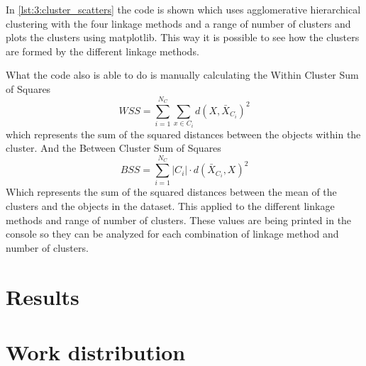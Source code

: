 \documentclass[twoside, a4paper, fleqn, reqno]{article}
\begin{document}
In \autoref{lst:3:cluster_scatters} the code is shown which uses agglomerative hierarchical clustering
with the four linkage methods and a range of number of clusters and plots the clusters using matplotlib.
This way it is possible to see how the clusters are formed by the different linkage methods.
\par
What the code also is able to do is manually calculating the Within Cluster Sum of Squares
\begin{equation*}
	WSS= \sum_{i = 1}^{N_C} \sum_{x \in C_i} d(X, \bar{X}_{C_i} )^2
\end{equation*}
which represents the sum of the squared distances between the objects within the cluster. 
And the Between Cluster Sum of Squares
\begin{equation*}
	BSS= \sum_{i = 1}^{N_C} \left\lvert C_i \right\rvert \cdot d(\bar{X}_{C_i},X)^2
\end{equation*}
Which represents the sum of the squared distances between the mean of the clusters and the objects in the dataset.
This applied to the different linkage methods and range of number of clusters.
These values are being printed in the console so they can be analyzed for each combination
of linkage method and number of clusters.

\section*{Results}


\section*{Work distribution}

\end{document}
